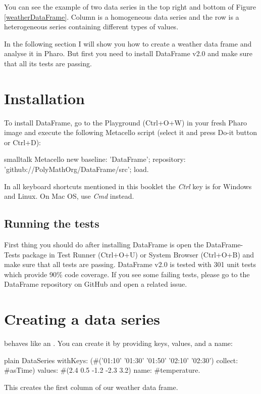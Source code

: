 \documentclass[10pt,twoside,english]{_support/latex/sbabook/sbabook}
\begin{document}
You can see the example of two data series in the top right and bottom of Figure \ref{weatherDataFrame}. Column  is a homogeneous  data series and the row  is a heterogeneous series containing different types of values.

In the following section I will show you how to create a weather data frame and analyse it in Pharo. But first you need to install DataFrame v2.0 and make sure that all its tests are passing.
\section{Installation}
To install DataFrame, go to the Playground (Ctrl+O+W) in your fresh Pharo image and execute the following Metacello script (select it and press Do-it button or Ctrl+D):

\begin{displaycode}{smalltalk}
Metacello new
  baseline: 'DataFrame';
  repository: 'github://PolyMathOrg/DataFrame/src';
  load.
\end{displaycode}

In all keyboard shortcuts mentioned in this booklet the \textit{Ctrl} key is for Windows and Linux. On Mac OS, use \textit{Cmd} instead.
\subsection{Running the tests}
First thing you should do after installing DataFrame is open the DataFrame-Tests package in Test Runner (Ctrl+O+U) or System Browser (Ctrl+O+B) and make sure that all tests are passing. DataFrame v2.0 is tested with 301 unit tests which provide 90\% code coverage. If you see some failing tests, please go to the DataFrame repository on GitHub and open a related issue.
\section{Creating a data series}\label{secCreatingDataSeries}
 behaves like an . You can create it by providing keys, values, and a name:

\begin{displaycode}{plain}
DataSeries
  withKeys: (#('01:10' '01:30' '01:50' '02:10' '02:30') collect: #asTime)
  values: #(2.4 0.5 -1.2 -2.3 3.2)
  name: #temperature.
\end{displaycode}

This creates the first column of our weather data frame.
\end{document}
